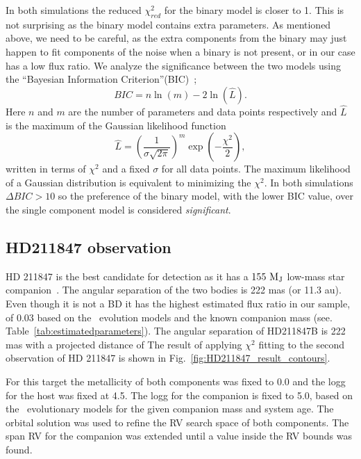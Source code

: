 \documentclass[fleqn,usenatbib]{mnras}
\newcommand*\bl{\color{blue}}
\begin{document}
In both simulations the reduced \(\chi^2_{red}\) for the binary model is closer to 1. This is not surprising as the binary model contains extra parameters. As mentioned above, we need to be careful, as the extra components from the binary may just happen to fit components of the noise when a binary is not present, or in our case has a low flux ratio.
{We {\bl analyze} the significance between the two models using the ``Bayesian Information Criterion''(BIC)~\citep{schwarz_estimating_1978}; }
\begin{equation}
BIC = n\ln{(m)} - 2\ln{(\hat{L})}.
\end{equation}
{Here $n$ and $m$ are the number of parameters and data points respectively and \(\hat{L}\) is the maximum of the Gaussian {\bl likelihood} function }
 \begin{equation}
 \hat{L} = \left(\frac{1}{\sigma \sqrt{2\pi}}\right)^m \exp{\left(-\frac{\chi^2}{2}\right)},
 \end{equation}
 {written in terms of \(\chi^2\) and a fixed $\sigma$ for all data points. The maximum {\bl likelihood} of a Gaussian distribution is equivalent to minimizing the \(\chi^2\). In both simulations \(\Delta BIC >10\) so the preference of the binary model, with the lower BIC value, over the single component model is considered \emph{significant}.}

\subsection{HD211847 observation}
\label{subsection:results-hd211847}
{HD 211847} is the best candidate for detection as it has a \(\rm 155~M_J\) low-mass star companion~\citet{moutou_eccentricity_2017}. The angular separation of the two bodies is 222 mas (or 11.3 au). Even though it is not a BD it has the highest estimated flux ratio in our sample, of 0.03 based on the~\citet{baraffe_new_2015} evolution models and the known companion mass (see. Table~\ref{tab:estimatedparameters}). The angular separation of HD211847B is 222 mas with a projected distance of The result of applying \(\chi^2\) fitting to the second observation of {HD 211847} is shown in Fig.~\ref{fig:HD211847_result_contours}.

For this target the metallicity of both components was fixed to 0.0 and the logg for the host was fixed at 4.5. The logg for the companion is fixed to 5.0, based on the~\citet{baraffe_new_2015} evolutionary models for the given companion mass and system age. The orbital solution was used to refine the RV search space of both components. The span RV for the companion was extended until a value inside the RV bounds was found.
\end{document}
